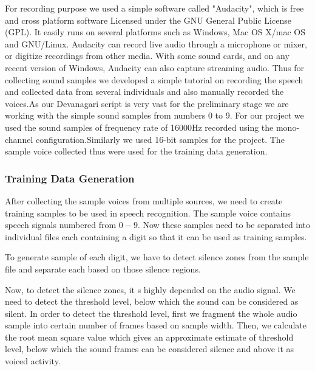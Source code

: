 For recording purpose we used a simple software called "Audacity", which
is free and cross platform software Licensed under the GNU General Public License (GPL).
It easily runs on several platforms such as Windows, Mac OS X/mac OS and GNU/Linux.
Audacity can record live audio through a microphone or mixer, 
or digitize recordings from other media. With some sound cards, and on 
any recent version of Windows, Audacity can also capture streaming audio. 
Thus for collecting sound samples we developed a simple tutorial on
recording the speech and collected data from several individuals and also manually 
recorded the voices.As our Devanagari script is very vast for the preliminary stage 
we are working with the simple sound samples from numbers 0 to 9. For our
project we used the sound samples of  frequency rate of 16000Hz recorded using
the mono-channel configuration.Similarly we used 16-bit samples for the project.
The sample voice collected thus were used for the training data generation.



\subsubsection{Training Data Generation}
After collecting the sample voices from multiple sources, we need to create training samples to be used in speech recognition. The sample voice contains speech signals numbered from $0 - 9$. Now these samples need to be separated into individual files each containing a digit so that it can be used as training samples. 

To generate sample of each digit, we have to detect silence zones from the sample file and separate each based on those silence regions.

Now, to detect the silence zones, it \textquotesingle  s highly depended on the audio signal. We need to detect the threshold level, below which the sound can be considered as silent. In order to detect the threshold level, first we fragment the whole audio sample into certain number of frames based on sample width. Then, we calculate the root mean square value which gives an approximate estimate of threshold level, below which the sound frames can be considered silence and above it as voiced activity.

